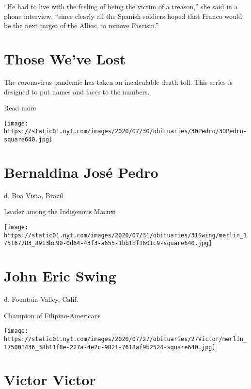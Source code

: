 ``He had to live with the feeling of being the victim of a treason,''
she said in a phone interview, ``since clearly all the Spanish soldiers
hoped that Franco would be the next target of the Allies, to remove
Fascism.''

\href{https://www.nytimes.com/interactive/2020/obituaries/people-died-coronavirus-obituaries.html?action=click\&pgtype=Article\&state=default\&region=BELOW_MAIN_CONTENT\&context=covid_obits_promo}{}

\hypertarget{those-weve-lost}{%
\section{Those We've Lost}\label{those-weve-lost}}

The coronavirus pandemic has taken an incalculable death toll. This
series is designed to put names and faces to the numbers.

Read more

\texttt{[image: https://static01.nyt.com/images/2020/07/30/obituaries/30Pedro/30Pedro-square640.jpg]}

\hypertarget{bernaldina-josuxe9-pedro}{%
\section{Bernaldina José Pedro}\label{bernaldina-josuxe9-pedro}}

d. Boa Vista, Brazil

Leader among the Indigenous Macuxi

\texttt{[image: https://static01.nyt.com/images/2020/07/31/obituaries/31Swing/merlin\_175167783\_8913bc90-0d64-43f3-a655-1bb1bf1601c9-square640.jpg]}

\hypertarget{john-eric-swing}{%
\section{John Eric Swing}\label{john-eric-swing}}

d. Fountain Valley, Calif.

Champion of Filipino-Americans

\texttt{[image: https://static01.nyt.com/images/2020/07/27/obituaries/27Victor/merlin\_175001436\_38b11f8e-227a-4e2c-9821-7618af9b2524-square640.jpg]}

\hypertarget{victor-victor}{%
\section{Victor Victor}\label{victor-victor}}

